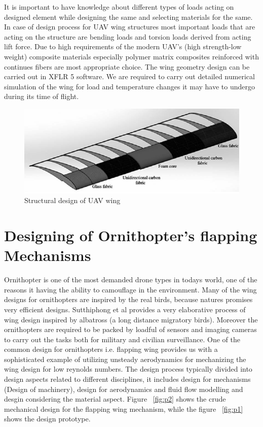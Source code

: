 \documentclass{article}
\begin{document}
It is important to have knowledge about different types of loads acting on designed element while designing the same and selecting materials for the same. In case of design process for UAV wing structures most important loads that are acting on the structure are bending loads and torsion loads derived from acting lift force. Due to high requirements of the modern UAV’s (high strength-low weight) composite materials especially polymer matrix composites reinforced with continues fibers are most appropriate choice. The wing geometry design can be carried out in XFLR 5 software. We are required to carry out detailed numerical simulation of the wing for load and temperature changes it may have to undergo during its time of flight.

\begin{figure}[h!]
\centering
\includegraphics[scale=0.5]{dfm3}
\caption{ Structural design of UAV wing}
\end{figure}

\section{Designing of Ornithopter's flapping Mechanisms}

Ornithopter is one of the most demanded drone types in todays world, one of the reasons it having the ability to camouflage in the environment. Many of the wing designs for ornithopters are inspired by the real birds, because natures promises very efficient designs. Sutthiphong et al
\citep{Sutthiphong} provides a very elaborative process of wing design inspired by albatross (a long distance migratory birds). Moreover the ornithopters are required to be packed by loadful of sensors and imaging cameras to carry out the tasks both for military and civilian surveillance. One of the common design for ornithopters i.e. flapping wing provides us with a sophisticated example of utilizing unsteady aerodynamics for mechanizing the wing design for low reynolds numbers. The design process typically divided into design aspects related to different disciplines, it includes design for mechanisms (Design of machinery), design for aerodynamics and fluid flow modelling and desgin considering the material aspect.
Figure  ~\ref{fig:p2} shows the crude mechanical design for the flapping wing mechanism, while the figure  ~\ref{fig:p1} shows the design prototype.
\end{document}
